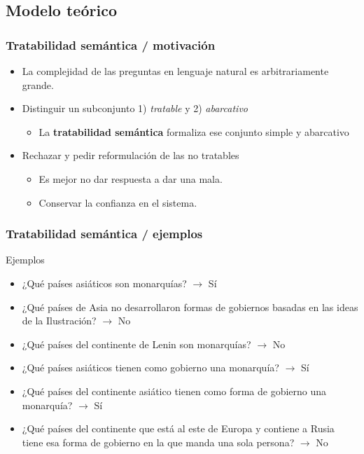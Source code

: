\subsection{Modelo teórico}


\begin{frame}[<+->]
  \frametitle{Tratabilidad semántica / motivación}
      \begin{itemize}
          \item La complejidad de las preguntas en lenguaje natural es arbitrariamente grande.
          \item Distinguir un subconjunto 1) \textit{tratable} y 2) \textit{abarcativo}
          \begin{itemize}
            \item La {\color{blue}\textbf{tratabilidad semántica}} formaliza ese conjunto simple y abarcativo
          \end{itemize}
          \item Rechazar y pedir reformulación de las no tratables
          \begin{itemize}
            \item Es mejor no dar respuesta a dar una mala. 
            \item Conservar la confianza en el sistema.
          \end{itemize}
      \end{itemize}
\end{frame}

\begin{frame}[<+->]
  \frametitle{Tratabilidad semántica / ejemplos}
    \begin{block}{Ejemplos}
      \begin{itemize}
          \item ¿Qué países asiáticos son monarquías? $\rightarrow$ {\color{green}Sí}
          \item ¿Qué países de Asia no desarrollaron formas de gobiernos basadas en las ideas de la Ilustración? $\rightarrow$ {\color{red}No}
          \item ¿Qué países del continente de Lenin son monarquías? $\rightarrow$ {\color{red}No}
          \item ¿Qué países asiáticos tienen como gobierno una monarquía? $\rightarrow$ {\color{green}Sí}
          \item ¿Qué países del continente asiático tienen como forma de gobierno una monarquía? $\rightarrow$ {\color{green}Sí}
          \item ¿Qué países del continente que está al este de Europa y contiene a Rusia tiene esa forma de gobierno en la que manda una sola persona? $\rightarrow$ {\color{red}No}
      \end{itemize}
    \end{block}
\end{frame}

